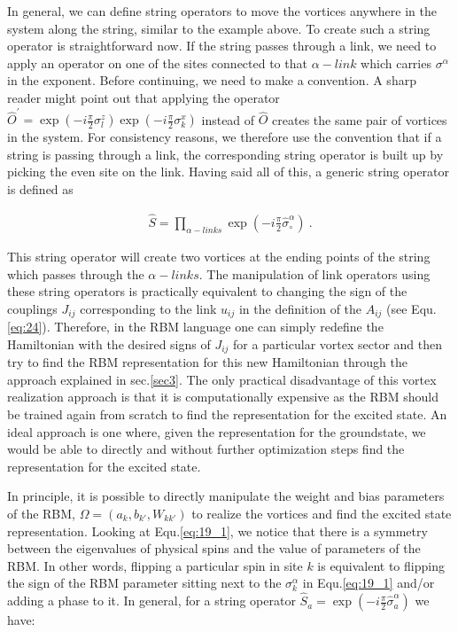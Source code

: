 \documentclass{article}
\begin{document}
In general, we can define string operators to move the vortices anywhere in the system along the string, similar to the example above. To create such a string operator is straightforward now. If the string passes through a link, we need to apply an operator on one of the sites connected to that $\alpha-link$ which carries $\sigma^\alpha$ in the exponent. Before continuing, we need to make a convention. A sharp reader might point out that applying the operator $\hat{O}^{'} = \exp{(-i\frac{\pi}{2}\sigma^z_l)} \exp{(-i\frac{\pi}{2}\sigma^x_k)}$ instead of $\hat{O}$ creates the same pair of vortices in the system. For consistency reasons, we therefore use the convention that if a string is passing through a link, the corresponding string operator is built up by picking the even site on the link. Having said all of this,  a generic string operator is defined as

\begin{equation}\label{eq:29}
	\begin{aligned}
		\hat{S} = \prod_{\alpha-links} \exp{(-i\frac{\pi}{2}\hat{\sigma}^\alpha_\circ)}~.
		\end{aligned}
\end{equation}

This string operator will create two vortices at the ending points of the string which passes through the $\alpha-links$. The manipulation of link operators using these string operators is practically equivalent to changing the sign of the couplings $J_{ij}$ corresponding to the link $u_{ij}$ in the definition of the $A_{ij}$ (see Equ.\hspace{0.2mm}\ref{eq:24}). Therefore, in the RBM language one can simply redefine the Hamiltonian with the desired signs of $J_{ij}$ for a particular vortex sector and then try to find the RBM representation for this new Hamiltonian through the approach explained in sec.\hspace{0.2mm}\ref{sec3}. The only practical disadvantage of this vortex realization approach is that it is computationally expensive as the RBM should be trained again from scratch to find the representation for the excited state. An ideal approach is one where, given the representation for the groundstate, we would be able to directly and without further optimization steps find the representation for the excited state. 

In principle, it is possible to directly manipulate the weight and bias parameters of the RBM,  $\Omega=(a_{k},b_{k'},W_{kk'})$ to realize the vortices and find the excited state representation. Looking at Equ.\hspace{0.2mm}\ref{eq:19_1}, we notice that there is a symmetry between the eigenvalues of physical spins and the value of parameters of the RBM. In other words, flipping a particular spin in site $k$ is equivalent to flipping the sign of the RBM parameter sitting next to the $\sigma^{\alpha}_k$ in Equ.\hspace{0.2mm}\ref{eq:19_1} and/or adding a phase to it. In general, for a string operator $\hat{S}_a = \exp{(-i\frac{\pi}{2}\hat{\sigma}^{\alpha}_a)}$ we have:
\end{document}
